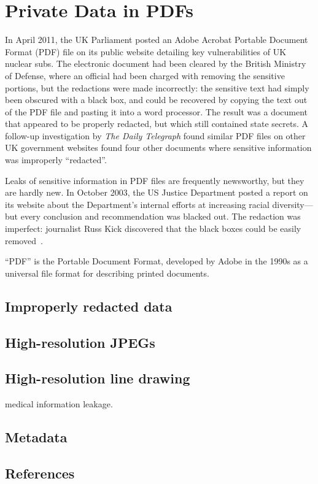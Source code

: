 \chapter{Private Data in PDFs}

In April 2011, the UK Parliament posted an
Adobe Acrobat Portable Document Format (PDF) file on its public website detailing key vulnerabilities of
UK nuclear subs. The electronic document had been cleared by the
British Ministry of Defense, where an official had been charged with
removing the sensitive portions, but the redactions were made incorrectly: the sensitive text had
simply been obscured with a black box, and could be
recovered by  copying the text out of the PDF file and pasting
it into a word processor. The
result was a document that appeared to  be properly redacted, but
which still contained state secrets.  A follow-up investigation by
\emph{The Daily Telegraph} found similar  PDF files on other UK government websites
found four other documents where sensitive
information was improperly ``redacted''\cite{telegraph-april2011-secrets}.

Leaks of sensitive information  in PDF files are frequently
newsworthy, but they are hardly new. In October 2003, the US Justice
Department posted a report on its website about the Department's
internal efforts at increasing racial diversity---but every conclusion and
recommendation was blacked out. The
redaction was imperfect: journalist
Russ Kick discovered that the black boxes
could be easily removed~\cite{nyt-diversity-critical}. 

``PDF'' is the Portable Document Format, developed by Adobe in the
1990s as a universal file format for describing printed documents. 

\section{Improperly redacted data}
\section{High-resolution JPEGs}
\section{High-resolution line drawing}
medical information leakage.
\section{Metadata}
\section{References}




